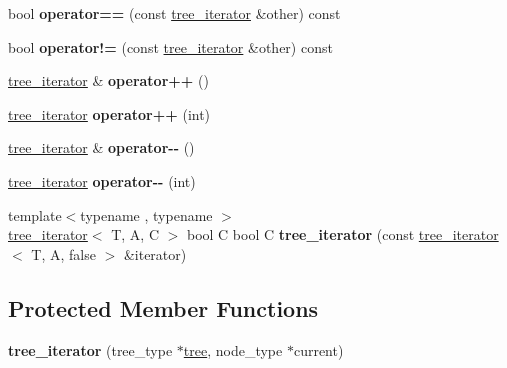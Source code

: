 \begin{DoxyCompactItemize}
\item 
bool {\bfseries operator==} (const \hyperlink{classds_1_1tree__iterator}{tree\+\_\+iterator} \&other) const \hypertarget{classds_1_1tree__iterator_a1612f3a3f4cc09550b3e0ac2b947715a}{}\label{classds_1_1tree__iterator_a1612f3a3f4cc09550b3e0ac2b947715a}

\item 
bool {\bfseries operator!=} (const \hyperlink{classds_1_1tree__iterator}{tree\+\_\+iterator} \&other) const \hypertarget{classds_1_1tree__iterator_a846d5807996606a11e731219855b4bac}{}\label{classds_1_1tree__iterator_a846d5807996606a11e731219855b4bac}

\item 
\hyperlink{classds_1_1tree__iterator}{tree\+\_\+iterator} \& {\bfseries operator++} ()\hypertarget{classds_1_1tree__iterator_a2f43bc8c01d9d85b5bd6d34757a2cebe}{}\label{classds_1_1tree__iterator_a2f43bc8c01d9d85b5bd6d34757a2cebe}

\item 
\hyperlink{classds_1_1tree__iterator}{tree\+\_\+iterator} {\bfseries operator++} (int)\hypertarget{classds_1_1tree__iterator_abd4cfd3e3f109b951ba6a39d1fbddcac}{}\label{classds_1_1tree__iterator_abd4cfd3e3f109b951ba6a39d1fbddcac}

\item 
\hyperlink{classds_1_1tree__iterator}{tree\+\_\+iterator} \& {\bfseries operator-\/-\/} ()\hypertarget{classds_1_1tree__iterator_a3a3c0de46115e32306be4b3127d15b41}{}\label{classds_1_1tree__iterator_a3a3c0de46115e32306be4b3127d15b41}

\item 
\hyperlink{classds_1_1tree__iterator}{tree\+\_\+iterator} {\bfseries operator-\/-\/} (int)\hypertarget{classds_1_1tree__iterator_a0f237f29f4c911fb51e7ff3ba3798e10}{}\label{classds_1_1tree__iterator_a0f237f29f4c911fb51e7ff3ba3798e10}

\item 
{\footnotesize template$<$typename , typename $>$ }\\\hyperlink{classds_1_1tree__iterator}{tree\+\_\+iterator}$<$ T, A, C $>$ bool C bool C {\bfseries tree\+\_\+iterator} (const \hyperlink{classds_1_1tree__iterator}{tree\+\_\+iterator}$<$ T, A, false $>$ \&iterator)\hypertarget{classds_1_1tree__iterator_a94bbec8c1816ef2d1d8cb48b0ca1b0b8}{}\label{classds_1_1tree__iterator_a94bbec8c1816ef2d1d8cb48b0ca1b0b8}

\end{DoxyCompactItemize}
\subsection*{Protected Member Functions}
\begin{DoxyCompactItemize}
\item 
{\bfseries tree\+\_\+iterator} (tree\+\_\+type $\ast$\hyperlink{classds_1_1tree}{tree}, node\+\_\+type $\ast$current)\hypertarget{classds_1_1tree__iterator_ad9b2900f59e1a9554470e47944a828aa}{}\label{classds_1_1tree__iterator_ad9b2900f59e1a9554470e47944a828aa}

\end{DoxyCompactItemize}
